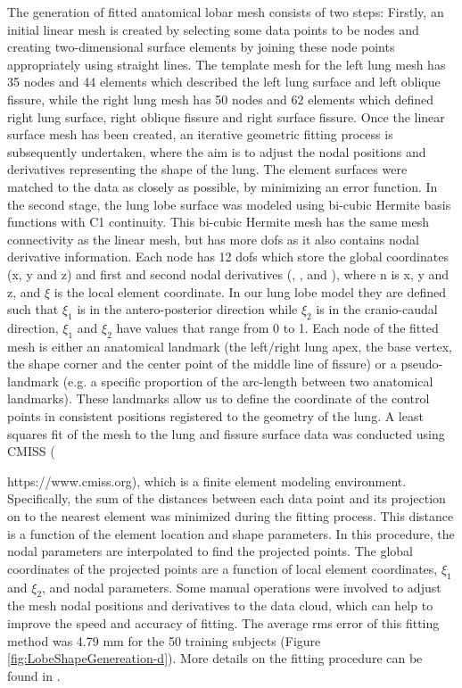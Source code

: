 The generation of fitted anatomical lobar mesh consists of two steps: Firstly, an initial linear mesh is created by selecting some data points to be nodes and creating two-dimensional surface elements by joining these node points appropriately using straight lines. The template mesh for the left lung mesh has 35 nodes and 44 elements which described the left lung surface and left oblique fissure, while the right lung mesh has 50 nodes and 62 elements which defined right lung surface, right oblique fissure and right surface fissure. Once the linear surface mesh has been created, an iterative geometric fitting process is subsequently undertaken, where the aim is to adjust the nodal positions and derivatives representing the shape of the lung. The element surfaces were matched to the data as closely as possible, by minimizing an error function. In the second stage, the lung lobe surface was modeled using bi-cubic Hermite basis functions with C1 continuity. This bi-cubic Hermite mesh has the same mesh connectivity as the linear mesh, but has more \gls{dof}s as it also contains nodal derivative information. Each node has 12 \gls{dof}s which store the global coordinates (x, y and z) and first and second nodal derivatives (, , and ), where n is x, y and z, and $\xi$ is the local element coordinate. In our lung lobe model they are defined such that $\xi_1$ is in the antero-posterior direction while $\xi_2$ is in the cranio-caudal direction, $\xi_1$ and $\xi_2$ have values that range from 0 to 1. Each node of the fitted mesh is either an anatomical landmark (the left/right lung apex, the base vertex, the shape corner and the center point of the middle line of fissure) or a pseudo-landmark (e.g. a specific proportion of the arc-length between two anatomical landmarks). These landmarks allow us to define the coordinate of the control points in consistent positions registered to the geometry of the lung. A least squares fit of the mesh to the lung and fissure surface data was conducted using CMISS ({https://www.cmiss.org), which is a finite element modeling environment. Specifically, the sum of the distances between each data point and its projection on to the nearest element was minimized during the fitting process. This distance is a function of the element location and shape parameters. In this procedure, the nodal parameters are interpolated to find the projected points. The global coordinates of the projected points are a function of local element coordinates, $\xi_1$ and $\xi_2$, and nodal parameters. Some manual operations were involved to adjust the mesh nodal positions and derivatives to the data cloud, which can help to improve the speed and accuracy of fitting. The average \gls{rms} error of this fitting method was 4.79 mm for the 50 training subjects (Figure \ref{fig:LobeShapeGenereation-d}). More details on the fitting procedure can be found in  \citep{bradley1997geometric,tawhai2003developing, fernandez2004anatomically}.  


}
